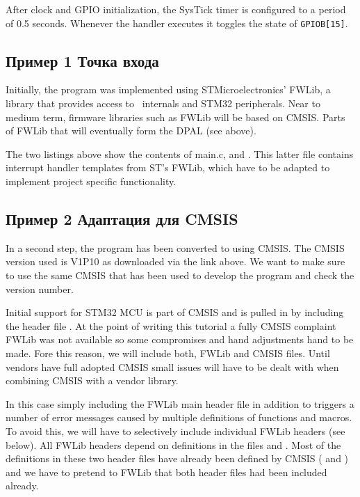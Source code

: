 After clock and GPIO initialization, the SysTick timer is configured to a period
of 0.5 seconds. Whenever the handler executes it toggles the state of
\verb|GPIOB[15]|.

\subsection{Пример 1 Точка входа}

Initially, the program was implemented using STMicroelectronics’ FWLib, a
library that provides access to \ internals and STM32 peripherals. Near
to medium term, firmware libraries such as FWLib will be based on CMSIS. Parts
of FWLib that will eventually form the DPAL (see above).





The two listings above show the contents of main.c, and .
This latter file contains interrupt handler templates from ST’s FWLib, which
have to be adapted to implement project specific functionality.

\subsection{Пример 2 Адаптация для CMSIS}

In a second step, the program has been converted to using CMSIS. The CMSIS
version used is V1P10 as downloaded via the link above. We want to make sure to
use the same CMSIS that has been used to develop the program and check the
version number.



Initial support for STM32 MCU is part of CMSIS and is pulled in by including the
header file . At the point of writing this tutorial a fully CMSIS
complaint FWLib was not available so some compromises and hand adjustments hand
to be made. Fore this reason, we will include both, FWLib and CMSIS files. Until
vendors have full adopted CMSIS small issues will have to be dealt with when
combining CMSIS with a vendor library.

In this case simply including the FWLib main header file 
in addition to  triggers a number of error messages caused by
multiple definitions of functions and macros. To avoid this, we will have to
selectively include individual FWLib headers (see below). All FWLib headers
depend on definitions in the files  and
. Most of the definitions in these two header files have
already been defined by CMSIS ( and )
and we have to pretend to FWLib that both header files had been included already.

